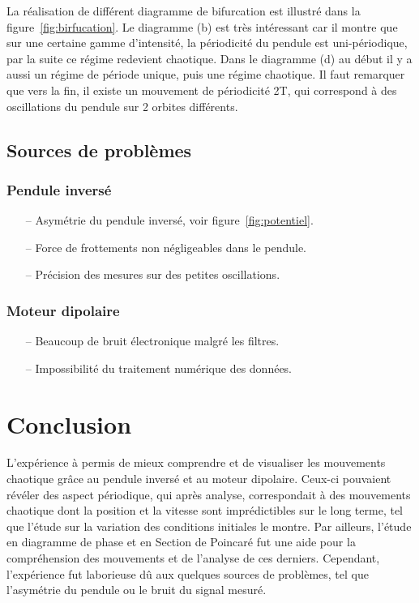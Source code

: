 \documentclass[a4paper,12pt,oneside]{article}
\begin{document}
La réalisation de différent diagramme de bifurcation est illustré dans la figure~\ref{fig:birfucation}. Le diagramme (b) est très intéressant car il montre que sur une certaine gamme d'intensité, la périodicité du pendule est uni-périodique, par la suite ce régime redevient chaotique.
Dans le diagramme (d) au début il y a aussi un régime de période unique, puis une régime chaotique. Il faut remarquer que vers la fin, il existe un mouvement de périodicité 2T, qui correspond à des oscillations du pendule sur 2 orbites différents.

\subsection{Sources de problèmes}

\subsubsection{Pendule inversé}
\begin{itemize}
	\item[--] Asymétrie du pendule inversé, voir figure~\ref{fig:potentiel}.
	\item[--] Force de frottements non négligeables dans le pendule.
	\item[--] Précision des mesures sur des petites oscillations.
\end{itemize}

\subsubsection{Moteur dipolaire}
\begin{itemize}
	\item[--] Beaucoup de bruit électronique malgré les filtres.
	\item[--] Impossibilité du traitement numérique des données.

\end{itemize}


\section{Conclusion}

L'expérience à permis de mieux comprendre et de visualiser les mouvements chaotique grâce au pendule inversé et au moteur dipolaire. Ceux-ci pouvaient révéler des aspect périodique, qui après analyse, correspondait à des mouvements chaotique dont la position et la vitesse sont imprédictibles sur le long terme, tel que l'étude sur la variation des conditions initiales le montre. Par ailleurs, l'étude en diagramme de phase et en Section de Poincaré fut une aide pour la compréhension des mouvements et de l'analyse de ces derniers.
Cependant, l'expérience fut laborieuse dû aux quelques sources de problèmes, tel que l'asymétrie du pendule ou le bruit du signal mesuré.






\begin{thebibliography}{99}
\end{thebibliography}
\end{document}
